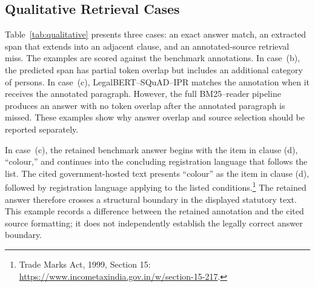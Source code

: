 \documentclass[pdflatex,sn-basic]{sn-jnl}%
\theoremstyle{thmstyleone}%
\theoremstyle{thmstyletwo}%
\theoremstyle{thmstylethree}%
\newcommand{\fixedreader}{LegalBERT--SQuAD--IPR}
\begin{document}
\subsection{Qualitative Retrieval Cases}
\label{sec:qualitative}

Table~\ref{tab:qualitative} presents three cases: an exact answer match, an
extracted span that extends into an adjacent clause, and an annotated-source
retrieval miss. The examples are scored against the benchmark annotations. In
case~(b), the predicted span has partial token overlap but includes an
additional category of persons. In case~(c), \fixedreader{} matches the
annotation when it receives the annotated paragraph. However, the full
BM25--reader pipeline produces an answer with no token overlap after the
annotated paragraph is missed. These examples show why answer overlap and
source selection should be reported separately.

\enlargethispage{6pt}%
In case~(c), the retained benchmark answer begins with the item in clause (d),
``colour,'' and continues into the concluding registration language that
follows the list. The cited government-hosted text presents ``colour'' as the
item in clause (d), followed by registration language applying to the listed
conditions.\footnote{Trade Marks Act, 1999, Section 15:
\url{https://www.incometaxindia.gov.in/w/section-15-217}.}
The retained answer therefore crosses a structural boundary in the displayed
statutory text. This example records a difference between the retained
annotation and the cited source formatting; it does not independently
establish the legally correct answer boundary.
\end{document}
